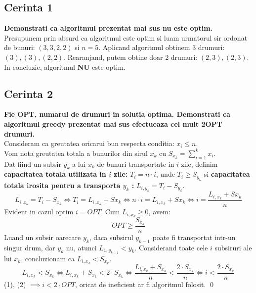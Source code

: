 \documentclass[12pt]{article}
\begin{document}
\subsection*{Cerinta 1}
{\bfseries{Demonstrati ca algoritmul prezentat mai sus nu este optim.}} \\
Presupunem prin absurd ca algoritmul este optim si luam urmatorul sir ordonat de bunuri: $(3, 3, 2, 2)$ si $n=5$. Aplicand algoritmul obtinem 3 drumuri: $(3), (3), (2, 2)$. Rearanjand, putem obtine doar 2 drumuri: $(2, 3), (2, 3)$. \\ 
In concluzie, algoritmul \textbf{NU} este optim.

\subsection*{Cerinta 2}
{\bfseries{Fie OPT, numarul de drumuri in solutia optima. Demonstrati ca algoritmul greedy prezentat mai sus efectueaza cel mult 2OPT drumuri.}} \\

Consideram ca greutatea oricarui bun respecta conditia: $x_i \leq n$. \\
Vom nota greutatea totala a bunurilor din sirul $x_k$ cu $S_{x_k} = \sum\limits_{i = 1}^{k} {x_i}$. \\ 
Dat fiind un subsir $y_k$ a lui $x_k$ de bunuri transportate in $i$ zile, definim \textbf{capacitatea totala utilizata in $i$ zile:} $T_i = n \cdot i$, unde $T_i \geq S_{y_k}$ si \textbf{capacitatea totala irosita pentru a transporta $y_k$ : } $L_{i,y_k} = T_i - S_{y_k}$.
\begin{equation*}
    L_{i,x_k} = T_i - S_{x_k} \Longleftrightarrow T_i = L_{i,x_k} + S{x_k} \Longleftrightarrow n \cdot i = L_{i,x_k} + S{x_k} \Longleftrightarrow i = \frac{L_{i,x_k} + S{x_k}}{n}
\end{equation*}
Evident in cazul optim $i = OPT$. Cum $L_{i,x_k} \geq 0$, avem:
\begin{equation}
    OPT \geq \frac{S_{x_k}}{n}
\end{equation}
Luand un subsir oarecare $y_k$, daca subsirul $y_{k-1}$ poate fi transportat intr-un singur drum, dar $y_{k}$ nu, atunci $L_{1,y_{k-1}} < y_k$. Considerand toate cele $i$ subsiruri ale lui $x_k$, concluzionam ca $L_{i,x_k} < S_{x_k}$.
\begin{equation}
    L_{i,x_k} < S_{x_k} \Longleftrightarrow L_{i,x_k} + S_{x_k} < 2 \cdot S_{x_k} \Longleftrightarrow \frac{L_{i,x_k} + S_{x_k}}{n} < \frac{2 \cdot S_{x_k}}{n} \Longleftrightarrow i < \frac{2 \cdot S_{x_k}}{n}
\end{equation}
(1), (2) $\implies i < 2 \cdot OPT$, oricat de ineficient ar fi algoritmul folosit. \qed
\end{document}
